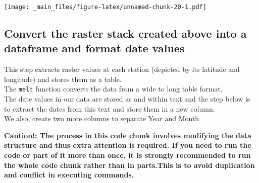 \documentclass[
]{book}
\begin{document}
\texttt{[image: \_main\_files/figure-latex/unnamed-chunk-20-1.pdf]}

\hypertarget{convert-the-raster-stack-created-above-into-a-dataframe-and-format-date-values}{%
\subsection{Convert the raster stack created above into a dataframe and format date values}\label{convert-the-raster-stack-created-above-into-a-dataframe-and-format-date-values}}

This step extracts raster values at each station (depicted by its latitude and longitude) and stores them as a table.\\
The \texttt{melt} function converts the data from a wide to long table format.\\
The date values in our data are stored as and within text and the step below is to extract the dates from this text and store them in a new column.\\
We also, create two more columns to separate Year and Month

\textbf{Caution!: The process in this code chunk involves modifying the data structure and thus extra attention is required. If you need to run the code or part of it more than once, it is strongly recommended to run the whole code chunk rather than in parts.This is to avoid duplication and conflict in executing commands.}
\end{document}
